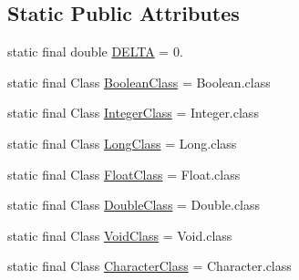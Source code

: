 \subsection*{Static Public Attributes}
\begin{DoxyCompactItemize}
\item 
static final double \hyperlink{classorg_1_1jgap_1_1gp_1_1_command_gene_aaae25157e6e9d3c86ce546a00673629e}{D\-E\-L\-T\-A} = 0.
\item 
static final Class \hyperlink{classorg_1_1jgap_1_1gp_1_1_command_gene_a5a4fe8e5d732bbd32363b683332808a7}{Boolean\-Class} = Boolean.\-class
\item 
static final Class \hyperlink{classorg_1_1jgap_1_1gp_1_1_command_gene_a8e354d57c541097dab355e145b048b22}{Integer\-Class} = Integer.\-class
\item 
static final Class \hyperlink{classorg_1_1jgap_1_1gp_1_1_command_gene_aa6af3e3a6fcf5e73f008eca7718a3b4e}{Long\-Class} = Long.\-class
\item 
static final Class \hyperlink{classorg_1_1jgap_1_1gp_1_1_command_gene_a45c853c890dbbba4a629bca1688ab16e}{Float\-Class} = Float.\-class
\item 
static final Class \hyperlink{classorg_1_1jgap_1_1gp_1_1_command_gene_a085d36818c24978468c002c57d982363}{Double\-Class} = Double.\-class
\item 
static final Class \hyperlink{classorg_1_1jgap_1_1gp_1_1_command_gene_a1214548cf4ac295646ccdf73259210d6}{Void\-Class} = Void.\-class
\item 
static final Class \hyperlink{classorg_1_1jgap_1_1gp_1_1_command_gene_abf05098901c0eb523e5f2bd9ee2879b4}{Character\-Class} = Character.\-class
\end{DoxyCompactItemize}
